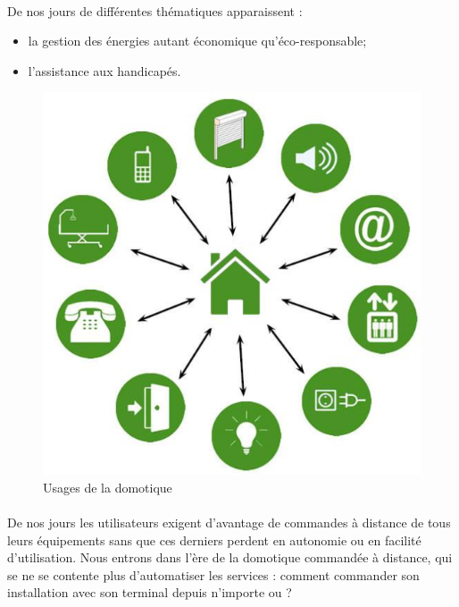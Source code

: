         \paragraph{}
De nos jours de différentes thématiques apparaissent :
            \begin{itemize}
                \item la gestion des énergies autant économique qu'éco-responsable;
                \item l'assistance aux handicapés.
            \end{itemize}
        \begin{figure}[h]
            \begin{center}
                \includegraphics[scale=0.4]{./images/cpl/partieDomotique.png}
            \end{center}
                \caption{ Usages de la domotique } %
                \label{Usages de la domotique}
        \end{figure}
        \paragraph{}
De nos jours les utilisateurs exigent d'avantage de commandes à distance de tous leurs équipements sans que ces derniers perdent en autonomie ou en facilité d'utilisation.
Nous entrons dans l’ère de la domotique commandée à distance, qui se ne se contente plus d'automatiser les services :
comment commander son installation avec son terminal depuis n'importe ou ?
